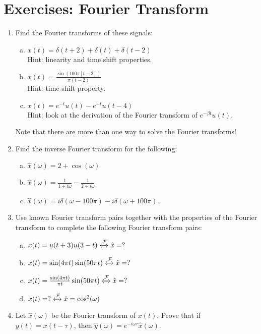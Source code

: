 \newpage
\section{Exercises: Fourier Transform}
\begin{enumerate}
  \item Find the Fourier transforms of these signals:
        \begin{enumerate}[a)]
          \item $x(t)=\delta(t+2)+\delta(t)+\delta(t-2)$ \\Hint: linearity and time shift properties.
          \item $x(t)=\frac{\sin(100\pi [t-2])}{\pi (t-2)}$ \\Hint: time shift property.
          \item $x(t)=e^{-t}u(t) - e^{-t} u(t-4)$ \\Hint: look at the derivation of 
          the Fourier transform of $e^{-\beta t} u(t)$.
        \end{enumerate}
        Note that there are more than one way to solve the Fourier transforms!

  \item Find the inverse Fourier transform for the following:
        \begin{enumerate}[a)]
          \item $\hat{x}(\omega)= 2 + \cos(\omega)$
          \item $\hat{x}(\omega) = \frac{1}{1+i\omega} - \frac{1}{2+i\omega}$
          \item $\hat{x}(\omega) = i \delta(\omega - 100\pi) - i\delta(\omega + 100\pi)$.
        \end{enumerate}

  \item Use known Fourier transform pairs together with the properties of the Fourier 
        transform to complete the following Fourier transform pairs:
        \begin{enumerate}[a)]
          \item $x(t) = u(t+3)u(3-t) \xleftrightarrow{\mathcal{F}} \hat{x} = ?$
          \item $x(t) = \sin(4\pi t) \sin(50 \pi t)  \xleftrightarrow{\mathcal{F}} \hat{x} = ?$
          \item $x(t) = \frac{\sin(4\pi t)}{\pi t} \sin(50 \pi t)  \xleftrightarrow{\mathcal{F}} \hat{x} = ?$
          \item $x(t) = ?  \xleftrightarrow{\mathcal{F}} \hat{x} = \cos^2(\omega)$
        \end{enumerate}

  \item Let $\hat{x}(\omega)$ be the Fourier transform of $x(t)$. Prove that if $y(t)=x(t-\tau)$, 
  then $\hat{y}(\omega)=e^{-i\omega\tau}\hat{x}(\omega)$.




\end{enumerate}
